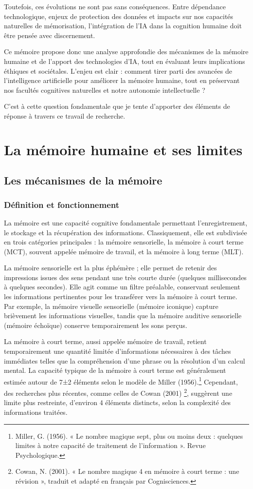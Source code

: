 \documentclass[12pt,a4paper]{report}
\begin{document}
Toutefois, ces évolutions ne sont pas sans conséquences. Entre dépendance technologique, enjeux de protection des données et impacts sur nos capacités naturelles de mémorisation, l’intégration de l’IA dans la cognition humaine doit être pensée avec discernement.

Ce mémoire propose donc une analyse approfondie des mécanismes de la mémoire humaine et de l’apport des technologies d’IA, tout en évaluant leurs implications éthiques et sociétales. L’enjeu est clair : comment tirer parti des avancées de l’intelligence artificielle pour améliorer la mémoire humaine, tout en préservant nos facultés cognitives naturelles et notre autonomie intellectuelle ?

C’est à cette question fondamentale que je tente d’apporter des éléments de réponse à travers ce travail de recherche.



\chapter{La mémoire humaine et ses limites}
\section{Les mécanismes de la mémoire}
\subsection{Définition et fonctionnement}
La mémoire est une capacité cognitive fondamentale permettant l'enregistrement, le stockage et la récupération des informations. Classiquement, elle est subdivisée en trois catégories principales : la mémoire sensorielle, la mémoire à court terme (MCT), souvent appelée mémoire de travail, et la mémoire à long terme (MLT).

La mémoire sensorielle est la plus éphémère ; elle permet de retenir des impressions issues des sens pendant une très courte durée (quelques millisecondes à quelques secondes). Elle agit comme un filtre préalable, conservant seulement les informations pertinentes pour les transférer vers la mémoire à court terme. Par exemple, la mémoire visuelle sensorielle (mémoire iconique) capture brièvement les informations visuelles, tandis que la mémoire auditive sensorielle (mémoire échoïque) conserve temporairement les sons perçus.

La mémoire à court terme, aussi appelée mémoire de travail, retient temporairement une quantité limitée d’informations nécessaires à des tâches immédiates telles que la compréhension d'une phrase ou la résolution d’un calcul mental. La capacité typique de la mémoire à court terme est généralement estimée autour de 7±2 éléments selon le modèle de Miller (1956).\footnote{Miller, G. (1956). « Le nombre magique sept, plus ou moins deux : quelques limites à notre capacité de traitement de l’information ». Revue Psychologique.} Cependant, des recherches plus récentes, comme celles de Cowan (2001) \footnote{Cowan, N. (2001). « Le nombre magique 4 en mémoire à court terme : une révision », traduit et adapté en français par Cognisciences.}, suggèrent une limite plus restreinte, d'environ 4 éléments distincts, selon la complexité des informations traitées.
\end{document}
